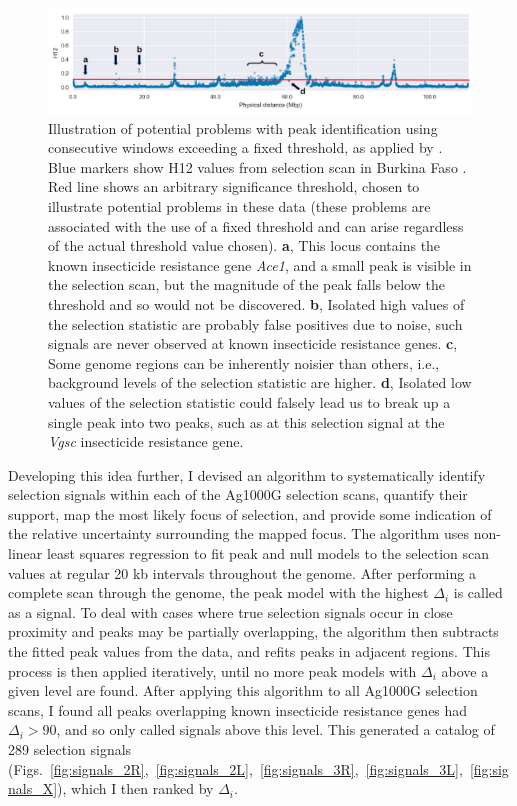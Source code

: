 \begin{refsection}
\begin{figure}[t!]
\centering
\includegraphics[width=1.1\textwidth,center]{artwork/chapter5/peak_problems.pdf}
\caption{Illustration of potential problems with peak identification using consecutive windows exceeding a fixed threshold, as applied by \textcite{Garud2015}.
%
Blue markers show H12 values from selection scan in Burkina Faso \agam.
%
Red line shows an arbitrary significance threshold, chosen to illustrate potential problems in these data (these problems are associated with the use of a fixed threshold and can arise regardless of the actual threshold value chosen).
%
\textbf{a}, This locus contains the known insecticide resistance gene \textit{Ace1}, and a small peak is visible in the selection scan, but the magnitude of the peak falls below the threshold and so would not be discovered.
%
\textbf{b}, Isolated high values of the selection statistic are probably false positives due to noise, such signals are never observed at known insecticide resistance genes.
%
\textbf{c}, Some genome regions can be inherently noisier than others, i.e., background levels of the selection statistic are higher.
%
\textbf{d}, Isolated low values of the selection statistic could falsely lead us to break up a single peak into two peaks, such as at this selection signal at the \textit{Vgsc} insecticide resistance gene.
}
\label{fig:peak_problems}
\end{figure}


Developing this idea further, I devised an algorithm to systematically identify selection signals within each of the Ag1000G selection scans, quantify their support, map the most likely focus of selection, and provide some indication of the relative uncertainty surrounding the mapped focus.
%
The algorithm uses non-linear least squares regression to fit peak and null models to the selection scan values at regular 20 kb intervals throughout the genome.
%
After performing a complete scan through the genome, the peak model with the highest $\Delta_i$ is called as a signal.
%
To deal with cases where true selection signals occur in close proximity and peaks may be partially overlapping, the algorithm then subtracts the fitted peak values from the data, and refits peaks in adjacent regions.
%
This process is then applied iteratively, until no more peak models with $\Delta_i$ above a given level are found.
%
After applying this algorithm to all Ag1000G selection scans, I found all peaks overlapping known insecticide resistance genes had $\Delta_i > 90$, and so only called signals above this level.
%
This generated a catalog of 289 selection signals (Figs.~\ref{fig:signals_2R},~\ref{fig:signals_2L},~\ref{fig:signals_3R},~\ref{fig:signals_3L},~\ref{fig:signals_X}), which I then ranked by $\Delta_i$.
%



\end{refsection}
